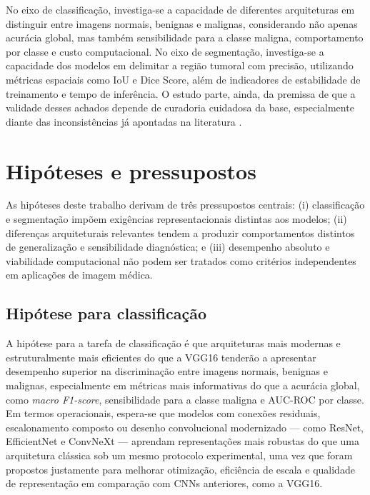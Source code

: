 \documentclass[tcc,capa]{texufpel}
\begin{document}
No eixo de classificação, investiga-se a capacidade de diferentes arquiteturas em distinguir entre imagens normais, benignas e malignas, considerando não apenas acurácia global, mas também sensibilidade para a classe maligna, comportamento por classe e custo computacional. No eixo de segmentação, investiga-se a capacidade dos modelos em delimitar a região tumoral com precisão, utilizando métricas espaciais como IoU e Dice Score, além de indicadores de estabilidade de treinamento e tempo de inferência. O estudo parte, ainda, da premissa de que a validade desses achados depende de curadoria cuidadosa da base, especialmente diante das inconsistências já apontadas na literatura \cite{AlDhabyani2020,Pawlowska2023}.

\section{Hipóteses e pressupostos}

As hipóteses deste trabalho derivam de três pressupostos centrais: (i) classificação e segmentação impõem exigências representacionais distintas aos modelos; (ii) diferenças arquiteturais relevantes tendem a produzir comportamentos distintos de generalização e sensibilidade diagnóstica; e (iii) desempenho absoluto e viabilidade computacional não podem ser tratados como critérios independentes em aplicações de imagem médica.

\subsection{Hipótese para classificação}

A hipótese para a tarefa de classificação é que arquiteturas mais modernas e estruturalmente mais eficientes do que a VGG16 tenderão a apresentar desempenho superior na discriminação entre imagens normais, benignas e malignas, especialmente em métricas mais informativas do que a acurácia global, como \textit{macro F1-score}, sensibilidade para a classe maligna e AUC-ROC por classe. Em termos operacionais, espera-se que modelos com conexões residuais, escalonamento composto ou desenho convolucional modernizado --- como ResNet, EfficientNet e ConvNeXt --- aprendam representações mais robustas do que uma arquitetura clássica sob um mesmo protocolo experimental, uma vez que foram propostos justamente para melhorar otimização, eficiência de escala e qualidade de representação em comparação com CNNs anteriores, como a VGG16. \cite{Simonyan2015,He2016,Tan2019,Liu2022ConvNeXt}
\end{document}
